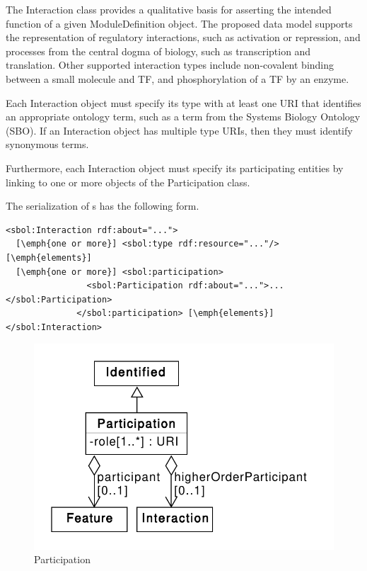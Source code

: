 The Interaction class provides a qualitative basis for asserting the intended function of a given ModuleDefinition object. The proposed data model supports the representation of regulatory interactions, such as activation or repression, and processes from the central dogma of biology, such as transcription and translation. Other supported interaction types include non-covalent binding between a small molecule and TF, and phosphorylation of a TF by an enzyme. 

Each Interaction object must specify its type with at least one URI that identifies an appropriate ontology term, such as a term from the Systems Biology Ontology (SBO). If an Interaction object has multiple type URIs, then they must identify synonymous terms. 


Furthermore, each Interaction object must specify its participating  entities by linking to one or more objects of the Participation class.

The serialization of s has the following form.
\begin{lstlisting}
<sbol:Interaction rdf:about="...">
  [\emph{one or more}] <sbol:type rdf:resource="..."/> [\emph{elements}]
  [\emph{one or more}] <sbol:participation>
                <sbol:Participation rdf:about="...">...</sbol:Participation>
              </sbol:participation> [\emph{elements}]
</sbol:Interaction>
\end{lstlisting}


\begin{figure}[ht]
\begin{center}
\includegraphics[scale=0.6]{uml/participation}
\caption[]{Participation}
\label{uml:participation}
\end{center}
\end{figure}

